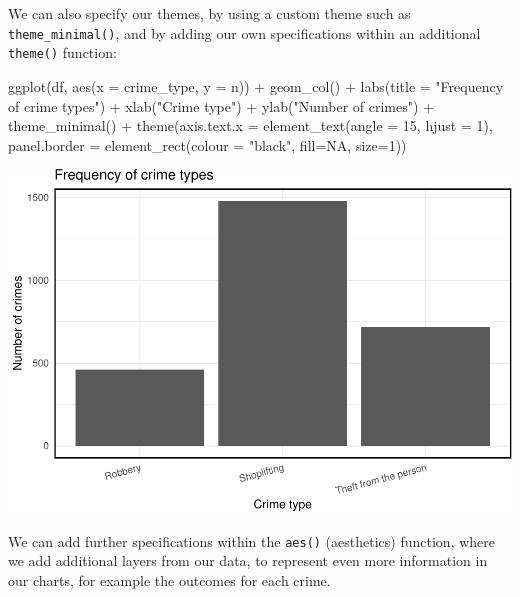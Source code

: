 \documentclass[
]{book}
\makeatletter
\newenvironment{Shaded}{\begin{snugshade}}{\end{snugshade}}
\newcommand{\AttributeTok}[1]{\textcolor[rgb]{0.61,0.61,0.61}{#1}}
\newcommand{\ConstantTok}[1]{\textcolor[rgb]{0,0,0}{#1}}
\newcommand{\DecValTok}[1]{\textcolor[rgb]{0.06,0.06,0.06}{#1}}
\newcommand{\FunctionTok}[1]{\textcolor[rgb]{0,0,0}{#1}}
\newcommand{\NormalTok}[1]{#1}
\newcommand{\SpecialCharTok}[1]{\textcolor[rgb]{0,0,0}{#1}}
\newcommand{\StringTok}[1]{\textcolor[rgb]{0.5,0.5,0.5}{#1}}
\newenvironment{kframe}{%
\medskip{}
\setlength{\fboxsep}{.8em}
 \def\at@end@of@kframe{}%
 \ifinner\ifhmode%
  \def\at@end@of@kframe{\end{minipage}}%
  \begin{minipage}{\columnwidth}%
 \fi\fi%
 \def\FrameCommand##1{\hskip\@totalleftmargin \hskip-\fboxsep
 \colorbox{shadecolor}{##1}\hskip-\fboxsep
     \hskip-\linewidth \hskip-\@totalleftmargin \hskip\columnwidth}%
 \MakeFramed {\advance\hsize-\width
   \@totalleftmargin\z@ \linewidth\hsize
   \@setminipage}}%
 {\par\unskip\endMakeFramed%
 \at@end@of@kframe}
\renewenvironment{Shaded}{\begin{kframe}}{\end{kframe}}
\makeatother
\begin{document}
We can also specify our themes, by using a custom theme such as \texttt{theme\_minimal()}, and by adding our own specifications within an additional \texttt{theme()} function:

\begin{Shaded}
\begin{Highlighting}[]
\FunctionTok{ggplot}\NormalTok{(df, }\FunctionTok{aes}\NormalTok{(}\AttributeTok{x =}\NormalTok{ crime\_type, }\AttributeTok{y =}\NormalTok{ n)) }\SpecialCharTok{+} 
  \FunctionTok{geom\_col}\NormalTok{() }\SpecialCharTok{+} 
  \FunctionTok{labs}\NormalTok{(}\AttributeTok{title =} \StringTok{"Frequency of crime types"}\NormalTok{) }\SpecialCharTok{+} 
  \FunctionTok{xlab}\NormalTok{(}\StringTok{"Crime type"}\NormalTok{) }\SpecialCharTok{+} 
  \FunctionTok{ylab}\NormalTok{(}\StringTok{"Number of crimes"}\NormalTok{) }\SpecialCharTok{+} 
  \FunctionTok{theme\_minimal}\NormalTok{() }\SpecialCharTok{+} 
  \FunctionTok{theme}\NormalTok{(}\AttributeTok{axis.text.x =} \FunctionTok{element\_text}\NormalTok{(}\AttributeTok{angle =} \DecValTok{15}\NormalTok{, }\AttributeTok{hjust =} \DecValTok{1}\NormalTok{), }
        \AttributeTok{panel.border =} \FunctionTok{element\_rect}\NormalTok{(}\AttributeTok{colour =} \StringTok{"black"}\NormalTok{, }\AttributeTok{fill=}\ConstantTok{NA}\NormalTok{, }\AttributeTok{size=}\DecValTok{1}\NormalTok{))}
\end{Highlighting}
\end{Shaded}

\includegraphics{crime_mapping_files/figure-latex/unnamed-chunk-11-1.pdf}

We can add further specifications within the \texttt{aes()} (aesthetics) function, where we add additional layers from our data, to represent even more information in our charts, for example the outcomes for each crime.
\end{document}
